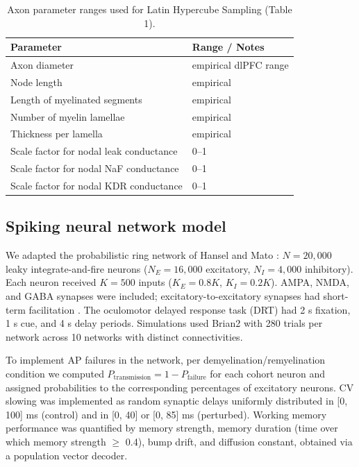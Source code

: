 \documentclass[11pt]{article}
\begin{document}
\begin{table}[h]
\centering
\caption{Axon parameter ranges used for Latin Hypercube Sampling (Table 1).}
\begin{tabular}{ll}
\toprule
Parameter & Range / Notes \\
\midrule
Axon diameter & empirical dlPFC range \\
Node length & empirical \cite{peters2003effects} \\
Length of myelinated segments & empirical \cite{waxman1980determinants} \\
Number of myelin lamellae & empirical \cite{peters2003effects} \\
Thickness per lamella & empirical \cite{moore1978simulations,peters2003effects} \\
Scale factor for nodal leak conductance & 0--1 \\
Scale factor for nodal NaF conductance & 0--1 \\
Scale factor for nodal KDR conductance & 0--1 \\
\bottomrule
\end{tabular}
\end{table}

\subsection{Spiking neural network model}
We adapted the probabilistic ring network of Hansel and Mato \cite{hansel2013shortterm}: $N = 20{,}000$ leaky integrate-and-fire neurons ($N_E = 16{,}000$ excitatory, $N_I = 4{,}000$ inhibitory). Each neuron received $K = 500$ inputs ($K_E = 0.8K$, $K_I = 0.2K$). AMPA, NMDA, and GABA synapses were included; excitatory-to-excitatory synapses had short-term facilitation \cite{markram1998differential,tsodyks1998neural}. The oculomotor delayed response task (DRT) had 2 s fixation, 1 s cue, and 4 s delay periods. Simulations used Brian2 \cite{stimberg2019brian} with 280 trials per network across 10 networks with distinct connectivities.

To implement AP failures in the network, per demyelination/remyelination condition we computed $P_{\mathrm{transmission}} = 1 - P_{\mathrm{failure}}$ for each cohort neuron and assigned probabilities to the corresponding percentages of excitatory neurons. CV slowing was implemented as random synaptic delays uniformly distributed in [0, 100] ms (control) and in [0, 40] or [0, 85] ms (perturbed). Working memory performance was quantified by memory strength, memory duration (time over which memory strength $\geq$ 0.4), bump drift, and diffusion constant, obtained via a population vector decoder.
\end{document}
